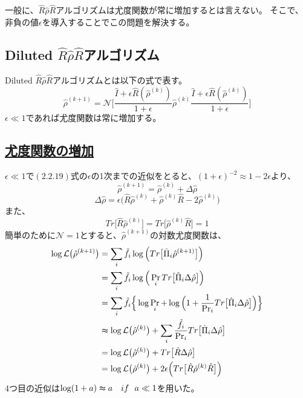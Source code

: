 \documentclass[11pt,a4j,notitlepage]{jreport}
\begin{document}
	一般に、$\hat{R} \hat{\rho} \hat{R}$アルゴリズムは尤度関数が常に増加するとは言えない。
	そこで、非負の値$\epsilon$を導入することでこの問題を解決する。

	\subsection{Diluted $\hat{R} \hat{\rho} \hat{R}$アルゴリズム}

	Diluted $\hat{R} \hat{\rho} \hat{R}$アルゴリズムとは以下の式で表す。
	\begin{equation}
		\hat{\rho}^{(k+1)} = \mathcal{N} \Bigg[ \frac{\hat{I} + \epsilon \hat{R} (\hat{\rho}^{(k)})}{1+\epsilon} \hat{\rho}^{(k)} \frac{\hat{I} + \epsilon \hat{R} (\hat{\rho}^{(k)})}{1+\epsilon} \Bigg]
	\end{equation}
	$\epsilon \ll 1$であれば尤度関数は常に増加する。

	\subsection*{\underline{尤度関数の増加}}

	$\epsilon \ll 1$で$(2.2.19)$式の$\epsilon$の1次までの近似をとると、$(1 + \epsilon)^{-2} \approx 1 - 2\epsilon$より、
	\begin{equation}
		\hat{\rho}^{(k+1)} = \hat{\rho}^{(k)} + \Delta \hat{\rho}
	\end{equation}
	\begin{equation}
		\Delta \hat{\rho} = \epsilon \big( \hat{R} \hat{\rho}^{(k)} + \hat{\rho}^{(k)} \hat{R} -2 \hat{\rho}^{(k)} \big)
	\end{equation}
	また、
	\begin{equation}
		Tr \big[ \hat{R} \hat{\rho}^{(k)} \big] = Tr \big[ \hat{\rho}^{(k)} \hat{R} \big] = 1 
	\end{equation}
	簡単のために$\mathcal{N} = 1$とすると、$\hat{\rho}^{(k+1)}$の対数尤度関数は、
	\begin{equation}
		\begin{aligned}
			\log \mathcal{L} \big( \hat{\rho}^{(k+1)} \big) &= \sum_i \tilde{f}_i \log \Big( Tr \big[ \hat{\Pi}_i \hat{\rho}^{(k+1)} \big] \Big) \\
			&= \sum_i \tilde{f}_i \log \Big( \Pr_i Tr \big[ \hat{\Pi}_i \Delta \hat{\rho} \big] \Big) \\
			&= \sum_i \tilde{f}_i \Big\{ \log \Pr_i + \log \Big( 1 + \frac{1}{\Pr_i} Tr \big[ \hat{\Pi}_i \Delta \hat{\rho} \big] \Big) \Big\} \\
			&\thickapprox \log \mathcal{L} \big( \hat{\rho}^{(k)} \big) + \sum_i \frac{\tilde{f}_i}{\Pr_i} Tr \big[ \hat{\Pi}_i \Delta \hat{\rho} \big] \\
			&= \log \mathcal{L} \big( \hat{\rho}^{(k)} \big) + Tr \big[ \hat{R} \Delta \hat{\rho} \big] \\
			&= \log \mathcal{L} \big( \hat{\rho}^{(k)} \big) + 2 \epsilon \Big( Tr \big[ \hat{R} \hat{\rho}^{(k)} \hat{R} \big] \Big)
		\end{aligned}
	\end{equation}
	4つ目の近似は$\log (1 + a) \thickapprox a\ \ \  if\ \  a \ll 1 $を用いた。\\
\end{document}
